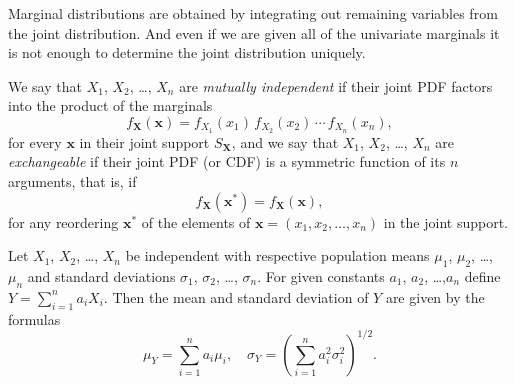 \documentclass[captions=tableheading]{scrbook}
\begin{document}
Marginal distributions are obtained by integrating out remaining variables from the joint distribution. And even if we are given all of the univariate marginals it is not enough to determine the joint distribution uniquely.

We say that \(X_{1}\), \(X_{2}\), \ldots{}, \(X_{n}\) are \emph{mutually independent} if their joint PDF factors into the product of the marginals
\begin{equation}
f_{\mathbf{X}}(\mathbf{x})=f_{X_{1}}(x_{1})\, f_{X_{2}}(x_{2})\,\cdots\, f_{X_{n}}(x_{n}),
\end{equation}
for every \(\mathbf{x}\) in their joint support \(S_{\mathbf{X}}\), and we say that \(X_{1}\), \(X_{2}\), \ldots{}, \(X_{n}\) are \emph{exchangeable} if their joint PDF (or CDF) is a symmetric function of its \(n\) arguments, that is, if 
\begin{equation}
f_{\mathbf{X}}(\mathbf{x^{\ast}})=f_{\mathbf{X}}(\mathbf{x}),
\end{equation}
for any reordering \(\mathbf{x^{\ast}}\) of the elements of \(\mathbf{x}=(x_{1},x_{2},\ldots,x_{n})\) in the joint support.

\begin{prop}
Let \(X_{1}\), \(X_{2}\), \ldots{}, \(X_{n}\) be independent with respective population means \(\mu_{1}\), \(\mu_{2}\), \ldots{}, \(\mu_{n}\) and standard deviations \(\sigma_{1}\), \(\sigma_{2}\), \ldots{}, \(\sigma_{n}\). For given constants \(a_{1}\), \(a_{2}\), \ldots{},\(a_{n}\) define \(Y=\sum_{i=1}^{n}a_{i}X_{i}\). Then the mean and standard deviation of \(Y\) are given by the formulas
\begin{equation}
\mu_{Y}=\sum_{i=1}^{n}a_{i}\mu_{i},\quad\sigma_{Y}=\left(\sum_{i=1}^{n}a_{i}^{2}\sigma_{i}^{2}\right)^{1/2}.
\end{equation}
\end{prop}
\end{document}
